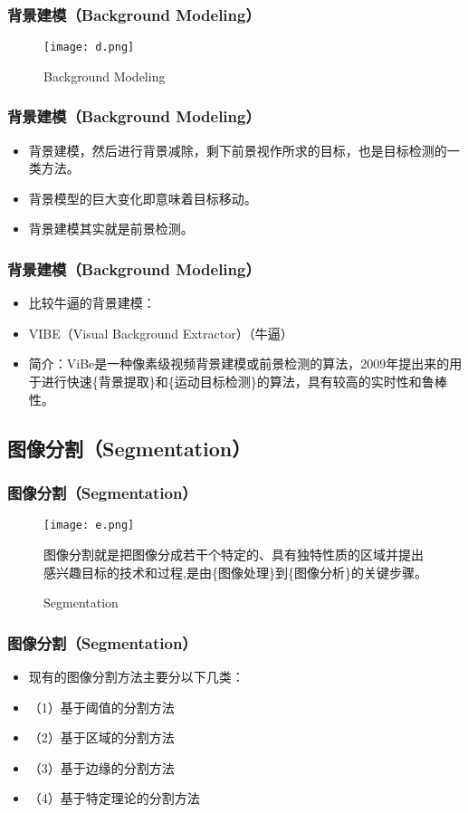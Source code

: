 \documentclass[notheorems,mathserif,table,compress]{beamer}  %
\begin{document}
\begin{frame}
  \frametitle{背景建模（Background Modeling）}  
  \begin{figure}[!ht]
  \centering\texttt{[image: d.png]}
  \caption{Background Modeling}
  \end{figure}
\end{frame}

\begin{frame}
  \frametitle{背景建模（Background Modeling）}  
  \begin{itemize}
  \item 背景建模，然后进行背景减除，剩下前景视作所求的目标，也是目标检测的一类方法。
  \item 背景模型的巨大变化即意味着目标移动。
  \item 背景建模其实就是前景检测。
  \end{itemize}
\end{frame}

\begin{frame}
  \frametitle{背景建模（Background Modeling）}  
  \begin{itemize}
  \item 比较牛逼的背景建模：
  \item VIBE（Visual Background Extractor）（牛逼）
  \item 简介：ViBe是一种像素级视频背景建模或前景检测的算法，2009年提出来的用于进行快速\{背景提取\}和\{运动目标检测\}的算法，具有较高的实时性和鲁棒性。
  \end{itemize}
\end{frame}%

\subsection{图像分割（Segmentation）}

\begin{frame}
  \frametitle{图像分割（Segmentation）}  
  \begin{figure}[!ht]
  \centering\texttt{[image: e.png]}
  \caption{Segmentation}
  \item 图像分割就是把图像分成若干个特定的、具有独特性质的区域并提出感兴趣目标的技术和过程,是由\{图像处理\}到\{图像分析\}的关键步骤。
  \end{figure}
\end{frame}

\begin{frame}
  \frametitle{图像分割（Segmentation）}  
  \begin{itemize}
  \item 现有的图像分割方法主要分以下几类：
  \item （1）基于阈值的分割方法
  \item （2）基于区域的分割方法
  \item （3）基于边缘的分割方法
  \item （4）基于特定理论的分割方法
  \end{itemize}
\end{frame}%
\end{document}
